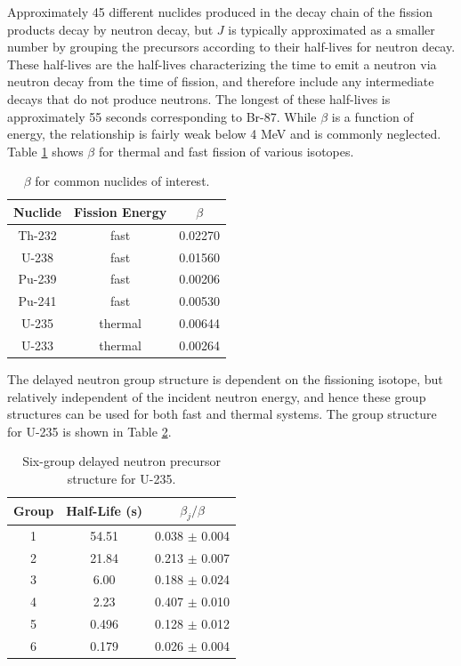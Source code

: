 Approximately 45 different nuclides produced in the decay chain of the fission products decay by neutron decay, but \(J\) is typically approximated as a smaller number by grouping the precursors according to their half-lives for neutron decay. These half-lives are the half-lives characterizing the time to emit a neutron via neutron decay from the time of fission, and therefore include any intermediate decays that do not produce neutrons. The longest of these half-lives is approximately 55 seconds corresponding to Br-87. While \(\beta\) is a function of energy, the relationship is fairly weak below 4 MeV and is commonly neglected. Table \ref{table:beta} shows \(\beta\) for thermal and fast fission of various isotopes.

\begin{table}[H] 
\caption{\(\beta\) for common nuclides of interest.}
\centering
\begin{tabular}{c c c}
\hline\hline
Nuclide & Fission Energy & \(\beta\)\\
\hline
Th-232 & fast & 0.02270\\
U-238 & fast  & 0.01560\\
Pu-239 & fast & 0.00206\\
Pu-241 & fast & 0.00530 \\
U-235 & thermal & 0.00644 \\
U-233 & thermal & 0.00264 \\
\hline
\end{tabular}
\label{table:beta}
\end{table}

The delayed neutron group structure is dependent on the fissioning isotope, but relatively independent of the incident neutron energy, and hence these group structures can be used for both fast and thermal systems. The group structure for U-235 is shown in Table \ref{table:U235_delayed}.

\begin{table}[H]
\caption{Six-group delayed neutron precursor structure for U-235.}
\centering
\begin{tabular}{c c c}
\hline\hline
Group & Half-Life (s) & \(\beta_j/\beta\)\\ [0.5ex]
\hline
1 & 54.51 & 0.038 \(\pm\) 0.004\\
2 & 21.84 & 0.213 \(\pm\) 0.007\\
3 & 6.00 & 0.188 \(\pm\) 0.024\\
4 & 2.23 & 0.407 \(\pm\) 0.010\\
5 & 0.496 & 0.128 \(\pm\) 0.012\\
6 & 0.179 & 0.026 \(\pm\) 0.004\\
\hline
\end{tabular}
\label{table:U235_delayed}
\end{table}

